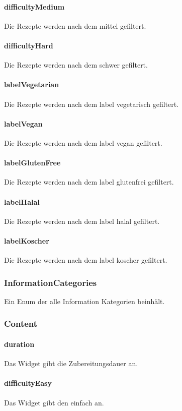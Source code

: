 \documentclass[parskip=full]{scrartcl}
\begin{document}
\paragraph*{difficultyMedium} Die Rezepte werden nach dem  mittel gefiltert.
\paragraph*{difficultyHard} Die Rezepte werden nach dem  schwer gefiltert.
\paragraph*{labelVegetarian} Die Rezepte werden nach dem \gls{label} vegetarisch gefiltert.
\paragraph*{labelVegan} Die Rezepte werden nach dem \gls{label} vegan gefiltert.
\paragraph*{labelGlutenFree} Die Rezepte werden nach dem \gls{label} glutenfrei gefiltert.
\paragraph*{labelHalal} Die Rezepte werden nach dem \gls{label} halal gefiltert.
\paragraph*{labelKoscher} Die Rezepte werden nach dem \gls{label} koscher gefiltert.


\subsubsection{InformationCategories} \label{sec:InformationCategories}
Ein Enum der alle Information Kategorien beinhält.
\subsubsection*{Content}
\paragraph*{duration} Das Widget gibt die Zubereitungsdauer an.
\paragraph*{difficultyEasy} Das Widget gibt den  einfach an.
\end{document}
